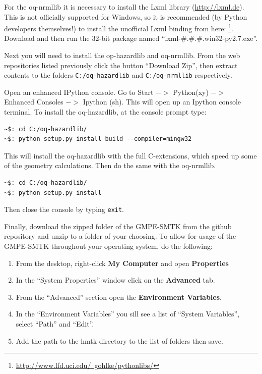 For the oq-nrmllib it is necessary to install the Lxml library (\href{http://lxml.de}{http://lxml.de}). This is not officially supported for Windows, so it is recommended (by Python developers themselves!) to install the unofficial Lxml binding from here: \footnote{\href{http://www.lfd.uci.edu/~gohlke/pythonlibs/}{http://www.lfd.uci.edu/~gohlke/pythonlibs/}}. Download and then run the 32-bit package named ``lxml-\#.\#.\#.win32-py2.7.exe''.

Next you will need to install the op-hazardlib and oq-nrmllib. From the web repositories listed previously click the button ``Download Zip'', then extract contents to the folders \verb=C:/oq-hazardlib= and \verb=C:/oq-nrmllib= respectively.

Open an enhanced IPython console. Go to Start $->$ Python(xy) $->$ Enhanced Consoles $->$ Ipython (sh). This will open up an Ipython console terminal. To install the oq-hazardlib, at the console prompt type:

\begin{Verbatim}[frame=single, commandchars=\\\{\}, fontsize=\scriptsize]
~$: cd C:/oq-hazardlib/
~$: python setup.py install build --compiler=mingw32
\end{Verbatim}

This will install the oq-hazardlib with the full C-extensions, which speed up some of the geometry calculations. Then do the same with the oq-nrmllib.

\begin{Verbatim}[frame=single, commandchars=\\\{\}, fontsize=\scriptsize]
~$: cd C:/oq-hazardlib/
~$: python setup.py install
\end{Verbatim}

Then close the console by typing \verb=exit=. 

Finally, download the zipped folder of the GMPE-SMTK from the github repository and unzip to a folder of your choosing. To allow for usage of the GMPE-SMTK throughout your operating system, do the following: 

\begin{enumerate}
\item From the desktop, right-click \textbf{My Computer} and open \textbf{Properties}
\item In the ``System Properties'' window click on the \textbf{Advanced} tab.
\item From the ``Advanced'' section open the \textbf{Environment Variables}.
\item In the ``Environment Variables'' you sill see a list of ``System Variables'', select ``Path'' and ``Edit''.
\item Add the path to the hmtk directory to the list of folders then save.
\end{enumerate}

